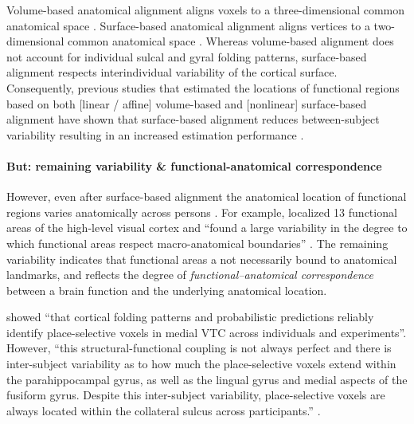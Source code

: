 Volume-based anatomical alignment \citep[s.][for a review]{klein2009evaluation}
aligns voxels to a three-dimensional common anatomical space \citep[e.g., MNI152
atlas;][]{fonov2011unbiased}.
Surface-based anatomical alignment \citep{fischl1999cortical, yeo2009spherical}
aligns vertices to a two-dimensional common anatomical space \citep[e.g.,
FreeSurfer fsaverage template;][]{fischl1999high}.
Whereas volume-based alignment does not account for individual sulcal and gyral
folding patterns, surface-based alignment respects interindividual variability
of the cortical surface.
Consequently, previous studies that estimated the locations of functional
regions based on both [linear / affine] volume-based and [nonlinear]
surface-based alignment have shown that surface-based alignment reduces
between-subject variability resulting in an increased estimation performance
\citep{rosenke2021probabilistic, frost2012measuring, wang2015probabilistic,
weiner2018defining}.


\paragraph{But: remaining variability \& functional-anatomical correspondence}

However, even after surface-based alignment the anatomical location of
functional regions varies anatomically across persons
\citep[e.g.,][]{coalson2018impact, benson2014correction, natu2021sulcal,
wang2015probabilistic, frost2012measuring, langers2014assessment, weiner2014mid,
rosenke2021probabilistic}.
For example, \citet{frost2012measuring} localized 13 functional areas of the
high-level visual cortex and ``found a large variability in the degree to which
functional areas respect macro-anatomical boundaries''
\citep{frost2012measuring}.
The remaining variability indicates that functional areas a not necessarily
bound to anatomical landmarks, and reflects the degree of
\textit{functional--anatomical correspondence} between a brain function and the
underlying anatomical location.



%
\citet{weiner2018defining} showed ``that cortical folding patterns and
probabilistic predictions reliably identify place-selective voxels in medial VTC
across individuals and experiments''.
%
However, ``this structural-functional coupling is not always perfect and there
is inter-subject variability as to how much the place-selective voxels extend
within the parahippocampal gyrus, as well as the lingual gyrus and medial
aspects of the fusiform gyrus.
%
Despite this inter-subject variability, place-selective voxels are always
located within the collateral sulcus across participants.''
\citep{weiner2018defining}.



